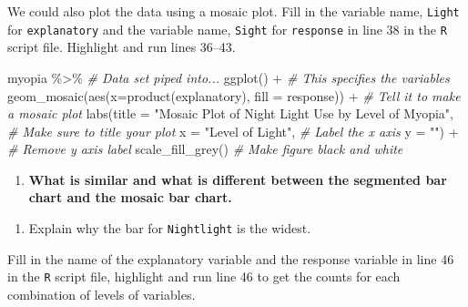 \documentclass[
]{report}
\newenvironment{Shaded}{\begin{snugshade}}{\end{snugshade}}
\newcommand{\AttributeTok}[1]{\textcolor[rgb]{0.77,0.63,0.00}{#1}}
\newcommand{\CommentTok}[1]{\textcolor[rgb]{0.56,0.35,0.01}{\textit{#1}}}
\newcommand{\FunctionTok}[1]{\textcolor[rgb]{0.00,0.00,0.00}{#1}}
\newcommand{\NormalTok}[1]{#1}
\newcommand{\SpecialCharTok}[1]{\textcolor[rgb]{0.00,0.00,0.00}{#1}}
\newcommand{\StringTok}[1]{\textcolor[rgb]{0.31,0.60,0.02}{#1}}
\providecommand{\tightlist}{%
  \setlength{\itemsep}{0pt}\setlength{\parskip}{0pt}}
\begin{document}
\vspace{0.5in}

We could also plot the data using a mosaic plot. Fill in the variable name, \texttt{Light} for \texttt{explanatory} and the variable name, \texttt{Sight} for \texttt{response} in line 38 in the \texttt{R} script file. Highlight and run lines 36--43.

\begin{Shaded}
\begin{Highlighting}[]
\NormalTok{myopia }\SpecialCharTok{\%\textgreater{}\%} \CommentTok{\# Data set piped into...}
  \FunctionTok{ggplot}\NormalTok{() }\SpecialCharTok{+}   \CommentTok{\# This specifies the variables}
  \FunctionTok{geom\_mosaic}\NormalTok{(}\FunctionTok{aes}\NormalTok{(}\AttributeTok{x=}\FunctionTok{product}\NormalTok{(explanatory), }\AttributeTok{fill =}\NormalTok{ response)) }\SpecialCharTok{+}  \CommentTok{\# Tell it to make a mosaic plot}
  \FunctionTok{labs}\NormalTok{(}\AttributeTok{title =} \StringTok{"Mosaic Plot of Night Light Use by Level of Myopia"}\NormalTok{,  }
       \CommentTok{\# Make sure to title your plot }
       \AttributeTok{x =} \StringTok{"Level of Light"}\NormalTok{,   }\CommentTok{\# Label the x axis}
       \AttributeTok{y =} \StringTok{""}\NormalTok{) }\SpecialCharTok{+}  \CommentTok{\# Remove y axis label}
      \FunctionTok{scale\_fill\_grey}\NormalTok{()  }\CommentTok{\# Make figure black and white}
\end{Highlighting}
\end{Shaded}

\begin{enumerate}
\def\labelenumi{\arabic{enumi}.}
\setcounter{enumi}{7}
\tightlist
\item
  \textbf{What is similar and what is different between the segmented bar chart and the mosaic bar chart.}
\end{enumerate}

\vspace{1in}

\begin{enumerate}
\def\labelenumi{\arabic{enumi}.}
\setcounter{enumi}{8}
\tightlist
\item
  Explain why the bar for \texttt{Nightlight} is the widest.
\end{enumerate}

\vspace{0.8in}

Fill in the name of the explanatory variable and the response variable in line 46 in the \texttt{R} script file, highlight and run line 46 to get the counts for each combination of levels of variables.
\end{document}
